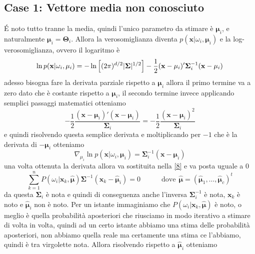 \subsection{Case 1: Vettore media non conosciuto}
\'E noto tutto tranne la media, quindi l'unico parametro da stimare è $\mathbf{\mu}_i$, e naturalmente $\mathbf{\mu}_i = \mathbf{\Theta}_i$. Allora la verosomiglianza diventa $p(\mathbf{x}|\omega_i, \mathbf{\mu}_i)$ e la log-verosomiglianza, ovvero il logaritmo è
\begin{equation}
\ln p(\mathbf{x}|\omega_i, \mathbf{\mu}_i) = - \ln \left[ (2\pi)^{d/2} \lvert\mathbf{\Sigma}\rvert^{1/2} \right] - \frac{1}{2}(\mathbf{x}-\mathbf{\mu}_i)' \mathbf{\Sigma}_i^{-1}(\mathbf{x}- \mathbf{\mu}_i) 
\end{equation}
adesso bisogna fare la derivata parziale rispetto a $\mathbf{\mu}_i$ allora il primo termine va a zero dato che è costante rispetto a $\mathbf{\mu}_i$, 
il secondo termine invece applicando semplici passaggi matematici otteniamo
\begin{equation}
- \frac{1}{2} \frac{(\mathbf{x}-\mathbf{\mu}_i)'(\mathbf{x}-\mathbf{\mu}_i)}{\mathbf{\Sigma}_i} = -\frac{1}{2} \frac{(\mathbf{x}-\mathbf{\mu}_i)^2}{\mathbf{\Sigma}_i}
\end{equation}
e quindi risolvendo questa semplice derivata e moltiplicando per $-1$ che è la derivata di $-\mathbf{\mu}_i$ otteniamo
\begin{equation}
\nabla_{\mu_i} \ln p(\mathbf{x}|\omega_i, \mathbf{\mu}_i) = \mathbf{\Sigma}_i^{-1}(\mathbf{x}-\mathbf{\mu}_i)
\end{equation}
una volta ottenuta la derivata allora va sostituita nella \ref{8} e va posta uguale a 0
\begin{equation}
\sum_{k=1}^n P(\omega_i|\mathbf{x}_k, \hat{\mathbf{\mu}}) \mathbf{\Sigma}^{-1}(\mathbf{x}_k - \mathbf{\hat{\mathbf{\mu}}}_i) = 0 \quad \quad \quad \text{dove} \ \ \hat{\mathbf{\mu}} = (\hat{\mathbf{\mu}}_1, \dots, \hat{\mathbf{\mu}}_c)^t
\end{equation}
da questa $\mathbf{\Sigma}_i$ è nota e quindi di conseguenza anche l'inversa $\mathbf{\Sigma}_i^{-1}$ è nota, $\mathbf{x}_k$ è noto e $\hat{\mathbf{\mu}}_i$ non è noto. Per un istante immaginiamo che $P(\omega_i|\mathbf{x}_k, \hat{\mathbf{\mu}})$ è noto, o meglio è quella probabilità aposteriori che riusciamo in modo iterativo a stimare di volta in volta, quindi ad un certo istante abbiamo una stima delle probabilità aposteriori, non abbiamo quella reale ma certamente una stima ce l'abbiamo, quindi è tra virgolette nota. Allora risolvendo rispetto a $\hat{\mathbf{\mu}}_i$ otteniamo
